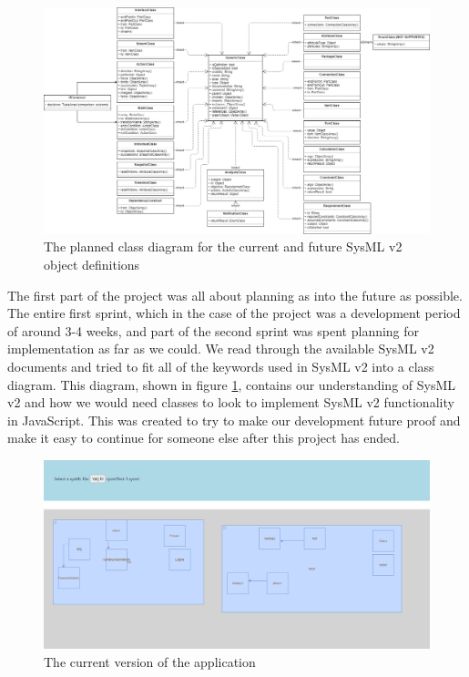 \documentclass{article}
\begin{document}
\begin{figure}[H]
    \centering
    \includegraphics[width=\textwidth]{Class_diagram-SysMLv2.png}
    \caption{The planned class diagram for the current and future SysML v2 object definitions}
    \label{fig:class_diagram}
\end{figure}
The first part of the project was all about planning as into the future as possible. The entire first sprint, which in the case of the project was a development period of around 3-4 weeks, and part of the second sprint was spent planning for implementation as far as we could. We read through the available SysML v2 documents and tried to fit all of the keywords used in SysML v2 into a class diagram. This diagram, shown in figure \ref{fig:class_diagram}, contains our understanding of SysML v2 and how we would need classes to look to implement SysML v2 functionality in JavaScript. This was created to try to make our development future proof and make it easy to continue for someone else after this project has ended.


\begin{figure}[H]
    \centering
    \includegraphics[width=\textwidth]{unknown.png}
    \caption{The current version of the application}
    \label{fig:my_label}
\end{figure}
\end{document}
